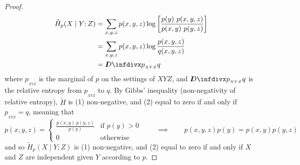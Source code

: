 \documentclass{article}
\begin{document}
\begin{proof}
	\begin{align*}
		\tilde H_p(X \mid Y; Z) &= \sum_{x,y, z}  p(x,y ,z) \log \left[\frac{p(y)\ p(x,y,z)}{p(x,y)\ p(y,z)} \right]  \\ %
		&= \sum_{x,y, z}  p(x,y ,z) \log \frac{p(x,y,z)}{q(x,y,z)}  \\
		&= \kldiv{p_{_{XYZ}}}{q}
	\end{align*}
	where $p_{_{XYZ}}$ is the marginal of $p$ on the settings of $XYZ$, and $\kldiv{p_{_{XYZ}}}{q}$ is the relative entropy from $p_{_{XYZ}}$ to $q$. By Gibbs' inequality (non-negativity of relative entropy), $\tilde H$ is  (1) non-negative, and (2) equal to zero if and only if $p_{_{XYZ}} = q$, meaning that 
	\[  p(x,y,z) =\begin{cases} \frac{p(x,y)\ p(y,z)}{p(y)} & \text{if }p(y) > 0\\ 0 & \text{otherwise} \end{cases} \qquad \implies \qquad p(x,y,z) p(y) = p(x,y) p(y, z) \] 
	and so $\tilde H_p(X \mid Y; Z)$ is (1) non-negative, and (2) equal to zero if and only if $X$ and $Z$ are independent given $Y$ according to $p$.
\end{proof}
\end{document}
